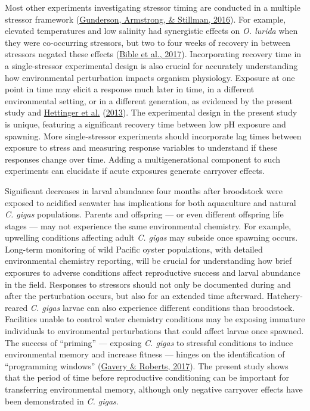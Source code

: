 \documentclass [11pt, proquest] {uwthesis}[2015/03/03]
\begin{document}
Most other experiments investigating stressor timing are conducted in a multiple stressor framework (\protect\hyperlink{ref-Gunderson2016}{Gunderson, Armstrong, \& Stillman, 2016}). For example, elevated temperatures and low salinity had synergistic effects on \emph{O. lurida} when they were co-occurring stressors, but two to four weeks of recovery in between stressors negated these effects (\protect\hyperlink{ref-Bible2017}{Bible et al., 2017}). Incorporating recovery time in a single-stressor experimental design is also crucial for accurately understanding how environmental perturbation impacts organism physiology. Exposure at one point in time may elicit a response much later in time, in a different environmental setting, or in a different generation, as evidenced by the present study and \protect\hyperlink{ref-Hettinger2013}{Hettinger et al.} (\protect\hyperlink{ref-Hettinger2013}{2013}). The experimental design in the present study is unique, featuring a significant recovery time between low pH exposure and spawning. More single-stressor experiments should incorporate lag times between exposure to stress and measuring response variables to understand if these responses change over time. Adding a multigenerational component to such experiments can elucidate if acute exposures generate carryover effects.

Significant decreases in larval abundance four months after broodstock were exposed to acidified seawater has implications for both aquaculture and natural \emph{C. gigas} populations. Parents and offspring --- or even different offspring life stages --- may not experience the same environmental chemistry. For example, upwelling conditions affecting adult \emph{C. gigas} may subside once spawning occurs. Long-term monitoring of wild Pacific oyster populations, with detailed environmental chemistry reporting, will be crucial for understanding how brief exposures to adverse conditions affect reproductive success and larval abundance in the field. Responses to stressors should not only be documented during and after the perturbation occurs, but also for an extended time afterward. Hatchery-reared \emph{C. gigas} larvae can also experience different conditions than broodstock. Facilities unable to control water chemistry conditions may be exposing immature individuals to environmental perturbations that could affect larvae once spawned. The success of ``priming'' --- exposing \emph{C. gigas} to stressful conditions to induce environmental memory and increase fitness --- hinges on the identification of ``programming windows'' (\protect\hyperlink{ref-Gavery2017}{Gavery \& Roberts, 2017}). The present study shows that the period of time before reproductive conditioning can be important for transferring environmental memory, although only negative carryover effects have been demonstrated in \emph{C. gigas}.
\end{document}
